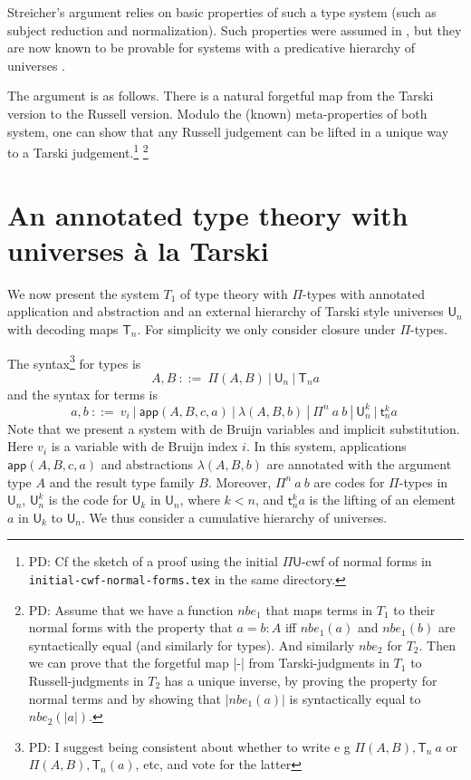 \documentclass[11pt,a4paper]{article}
\theoremstyle{definition}
\def\UU{\mathsf{U}}
\newcommand{\LAM}{\lambda}
\newcommand{\APP}{\mathsf{app}}
\newcommand{\T}{\mathsf{T}}
\newcommand{\sT}{\mathsf{t}}
\begin{document}
Streicher's argument relies on  basic properties of such a type system (such as subject reduction and normalization). Such properties were assumed in \cite{Streicher:semtt}, but they are now known to be provable
for systems with a predicative hierarchy of universes \cite{coquand:sophia,abel:neworleans,abel:wroclaw,coq18}.

The argument is as follows. There is a natural forgetful map from the Tarski version to the Russell version. Modulo the (known) meta-properties of both system, one can show that any Russell judgement can be lifted in a unique way to a Tarski judgement.\footnote{PD: Cf the sketch of a proof using the initial $\Pi\UU$-cwf of normal forms in {\tt initial-cwf-normal-forms.tex} in the same directory.}
\footnote{PD: Assume that we have a function $nbe_1$ that maps terms in $T_1$ to their normal forms with the property that $a = b : A$ iff $nbe_1(a)$ and $nbe_1(b)$ are syntactically equal (and similarly for types). And similarly $nbe_2$ for $T_2$. Then we can prove that the forgetful map |-| from Tarski-judgments in $T_1$ to Russell-judgments in $T_2$ has a unique inverse, by proving the property for normal terms and by showing that $|nbe_1(a)|$ is syntactically equal to $nbe_2(|a|)$. }

\section{An annotated type theory with universes \`a la Tarski}

We now present the system $T_1$ of type theory with $\Pi$-types with annotated application and abstraction and an external hierarchy of Tarski style universes $\UU_n$ with decoding maps $\T_n$. For simplicity we only consider closure under $\Pi$-types. 

The syntax\footnote{PD: 
I suggest being consistent about whether to write e g $\Pi(A,B), \T_n~a$ 
or $\Pi(A,B),\T_n(a)$, etc, and vote for the latter
} 
for types is
$$
A,B~::=~\Pi({A},B)~|~\UU_n~|~\T_n a
$$
and the syntax for terms is
$$
a,b~::=~v_i~|~\APP(A,B,c,a)~|~\LAM(A,B,b)~|~\Pi^n~ a~b~|~\UU^k_n~|~\sT^k_n a~
$$
Note that we present a system with de Bruijn variables and implicit substitution.
Here $v_i$ is a variable with de Bruijn index $i$. In this system, applications $\APP(A,B,c,a)$ and abstractions $\LAM(A,B,b)$ are annotated with the argument type $A$ and the result type family $B$. Moreover, $\Pi^n~ a~b$ are codes for $\Pi$-types in $\UU_n$, $\UU^k_n$ is the code for $\UU_k$ in $\UU_n$, where $k < n$, and $\sT^k_n a$ is the lifting of an element $a$ in $\UU_k$ to $\UU_n$. We thus consider a cumulative hierarchy of universes.
\end{document}
